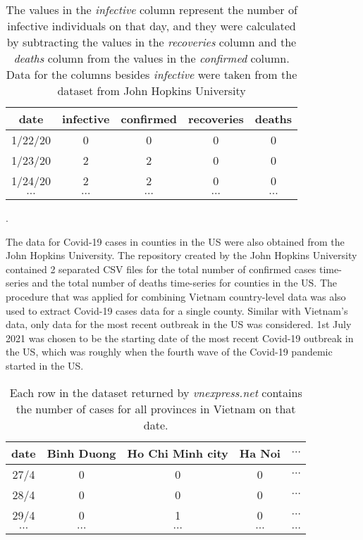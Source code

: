 \begin{table}[h]
\centering
\begin{tabular}{| c | c | c | c | c |}
    date & infective & confirmed & recoveries & deaths \\
    \hline\hline
    1/22/20 & 0 & 0 & 0 & 0 \\
    \hline
    1/23/20 & 2 & 2 & 0 & 0 \\
    \hline
    1/24/20 & 2 & 2 & 0 & 0 \\
    \hline
    $\cdots$ & $\cdots$ & $\cdots$ & $\cdots$ & $\cdots$ \\
\end{tabular}
\caption{The values in the \textit{infective} column represent the number of infective individuals on that day, and they were calculated by subtracting the values in the \textit{recoveries} column and the \textit{deaths} column from the values in the \textit{confirmed} column. Data for the columns besides \textit{infective} were taken from the dataset from John Hopkins University \cite{dongInteractiveWebbasedDashboard2020}}.
\label{tab:country-covid-timeseries}
\end{table}

The data for Covid-19 cases in counties in the \gls{US} were also obtained from the John Hopkins University.
The repository created by the John Hopkins University \cite{dongInteractiveWebbasedDashboard2020} contained 2 separated CSV files for the total number of confirmed cases time-series and the total number of deaths time-series for counties in the \gls{US}.
The procedure that was applied for combining Vietnam country-level data was also used to extract Covid-19 cases data for a single county.
Similar with Vietnam's data, only data for the most recent outbreak in the \gls{US} was considered.
1st July 2021 was chosen to be the starting date of the most recent Covid-19 outbreak in the US, which was roughly when the fourth wave of the Covid-19 pandemic started in the \gls{US}.

\begin{table}[h]
\centering
\begin{tabular}{|c | c | c | c | c }
    date & Binh Duong & Ho Chi Minh city & Ha Noi & $\cdots$ \\
    \hline\hline
    27/4 & 0 & 0 & 0 & $\cdots$ \\
    \hline
    28/4 & 0 & 0 & 0 & $\cdots$ \\
    \hline
    29/4 & 0 & 1 & 0 & $\cdots$ \\
    \hline
    $\cdots$ & $\cdots$ & $\cdots$ & $\cdots$ & $\cdots$ \\
\end{tabular}
\caption{Each row in the dataset returned by \textit{vnexpress.net} contains the number of cases for all provinces in Vietnam on that date.}
\label{tab:vietnam-provinces-timeseries}
\end{table}


